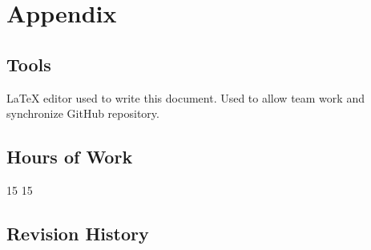 \section{Appendix}
\subsection{Tools}
\begin{itemize}
	 \LaTeX{} editor used to write this document.
	 Used to allow team work and synchronize GitHub repository.
\end{itemize}
\subsection{Hours of Work}
\begin{itemize}
	 15
	 15
\end{itemize}
\subsection{Revision History}
